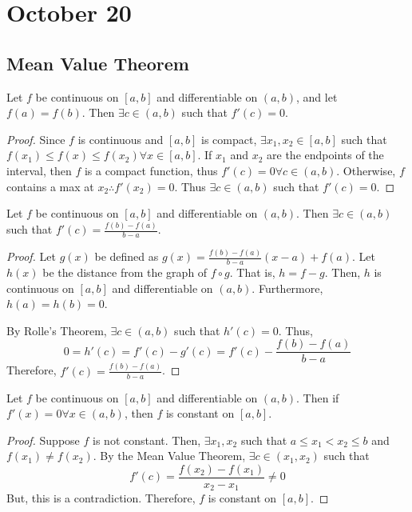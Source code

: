 \section{October 20}

\subsection{Mean Value Theorem}
\begin{theorem}
    Let $f$ be continuous on $[a,b]$ and differentiable on $(a,b)$, and let $f(a) = f(b)$. Then $\exists c \in (a,b)$ such that $f'(c) = 0$.
\end{theorem}
\begin{proof}
    Since $f$ is continuous and $[a, b]$ is compact, $\exists x_1, x_2 \in [a, b]$ such that $f(x_1) \leq f(x) \leq f(x_2) \forall x \in [a, b]$. If $x_1$ and $x_2$ are the endpoints of the interval, then $f$ is a compact function, thus $f'(c) = 0 \forall c \in (a, b)$. Otherwise, $f$ contains a max at $x_2 \therefore f'(x_2) = 0$. Thus $\exists c \in (a, b)$ such that $f'(c) = 0$.
\end{proof}

\begin{theorem}
    Let $f$ be continuous on $[a,b]$ and differentiable on $(a,b)$. Then $\exists c \in (a,b)$ such that $f'(c) = \frac{f(b) - f(a)}{b - a}$.
\end{theorem}
\begin{proof}
    Let $g(x)$ be defined as $g(x) = \frac{f(b) - f(a)}{b - a} (x - a) + f(a)$. Let $h(x)$ be the distance from the graph of $f \circ g$. That is, $h = f - g$. Then, $h$ is continuous on $[a, b]$ and differentiable on $(a, b)$. Furthermore, $h(a) = h(b) = 0$.
    
    By Rolle's Theorem, $\exists c \in (a, b)$ such that $h'(c) = 0$. Thus, $$0 = h'(c) = f'(c) - g'(c) = f'(c) - \frac{f(b) - f(a)}{b - a}$$ Therefore, $f'(c) = \frac{f(b) - f(a)}{b - a}$.
\end{proof}

\begin{theorem}
    Let $f$ be continuous on $[a,b]$ and differentiable on $(a,b)$. Then if $f'(x) = 0 \forall x \in (a, b)$, then $f$ is constant on $[a, b]$.
\end{theorem}
\begin{proof}
    Suppose $f$ is not constant. Then, $\exists x_1, x_2$ such that $a \leq x_1 < x_2 \leq b$ and $f(x_1) \neq f(x_2)$. By the Mean Value Theorem, $\exists c \in (x_1, x_2)$ such that $$f'(c) = \frac{f(x_2) - f(x_1)}{x_2 - x_1} \neq 0$$ But, this is a contradiction. Therefore, $f$ is constant on $[a, b]$.
\end{proof}

